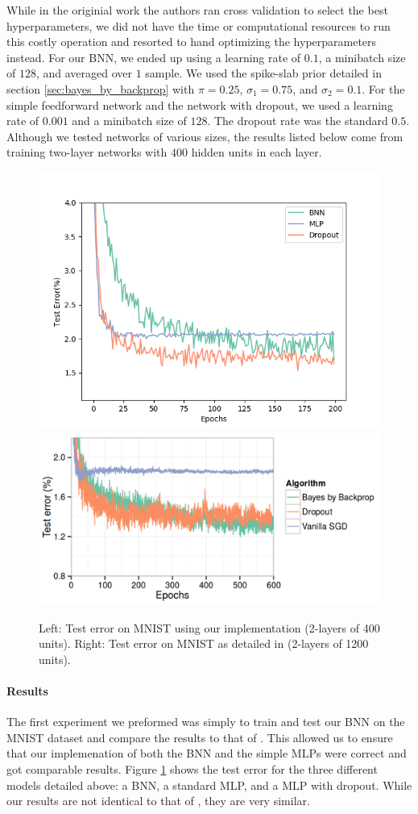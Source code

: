\documentclass[11pt]{article}
\begin{document}
While in the originial work the authors ran cross validation to select the best
hyperparameters, we did not have the time or computational resources to run this
costly operation and resorted to hand optimizing the hyperparameters instead.
For our BNN, we ended up using a learning rate of $0.1$, a minibatch size of 
$128$, and averaged over $1$ sample. We used the spike-slab prior detailed in
section \ref{sec:bayes_by_backprop} with $\pi = 0.25$, $\sigma_1 = 0.75$, and 
$\sigma_2 = 0.1$. For the simple feedforward network and the network with 
dropout, we used a learning rate of $0.001$ and a minibatch size of $128$.
The dropout rate was the standard $0.5$. Although we tested networks of various
sizes, the results listed below come from training two-layer networks with
$400$ hidden units in each layer.

\begin{figure}[H]
  \centering\includegraphics[width=.45\textwidth]{figures/test_error_compare.png}
  \centering\includegraphics[width=.45\textwidth]{figures/test_error_compare_paper.png}
  \caption{Left: Test error on MNIST using our implementation (2-layers of 400 units).
  Right: Test error on MNIST as detailed in \cite{blundell} (2-layers of 1200 units).}
  \label{fig:mnist_test_error}
\end{figure}
 

\paragraph{Results}
The first experiment we preformed was simply to train and test our BNN on the 
MNIST dataset and compare the results to that of \cite{blundell}. This allowed us
to ensure that our implemenation of both the BNN and the simple MLPs were correct
and got comparable results. Figure \ref{fig:mnist_test_error} shows the test
error for the three different models detailed above: a BNN, a standard MLP,
and a MLP with dropout. While our results are not identical to that of 
\cite{blundell}, they are very similar. 
\end{document}
